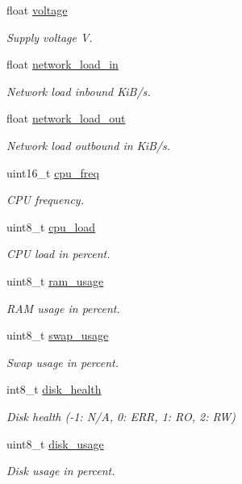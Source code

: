 \begin{DoxyCompactItemize}
float \hyperlink{struct____mavlink__onboard__health__t_a63f5df641cd3ed8be2383ef20a722839}{voltage}
\begin{DoxyCompactList}\small\item\em Supply voltage V. \end{DoxyCompactList}\item 
float \hyperlink{struct____mavlink__onboard__health__t_a011cccc424ed465b57dddd3bba36a4b5}{network\+\_\+load\+\_\+in}
\begin{DoxyCompactList}\small\item\em Network load inbound Ki\+B/s. \end{DoxyCompactList}\item 
float \hyperlink{struct____mavlink__onboard__health__t_a472007050b0e6533c2933fad245f6c75}{network\+\_\+load\+\_\+out}
\begin{DoxyCompactList}\small\item\em Network load outbound in Ki\+B/s. \end{DoxyCompactList}\item 
uint16\+\_\+t \hyperlink{struct____mavlink__onboard__health__t_a2d8c4b91795a9c519f1fcd0f31991138}{cpu\+\_\+freq}
\begin{DoxyCompactList}\small\item\em C\+P\+U frequency. \end{DoxyCompactList}\item 
uint8\+\_\+t \hyperlink{struct____mavlink__onboard__health__t_a3d36195b20398d29d74c79cafd00f16a}{cpu\+\_\+load}
\begin{DoxyCompactList}\small\item\em C\+P\+U load in percent. \end{DoxyCompactList}\item 
uint8\+\_\+t \hyperlink{struct____mavlink__onboard__health__t_af183f121fb9c0bf2cdfda9298e291f2d}{ram\+\_\+usage}
\begin{DoxyCompactList}\small\item\em R\+A\+M usage in percent. \end{DoxyCompactList}\item 
uint8\+\_\+t \hyperlink{struct____mavlink__onboard__health__t_abc5e2e0aac9dd67244bafec63725e55e}{swap\+\_\+usage}
\begin{DoxyCompactList}\small\item\em Swap usage in percent. \end{DoxyCompactList}\item 
int8\+\_\+t \hyperlink{struct____mavlink__onboard__health__t_a080927aed4b1fe7205a1c5bc611d7bbd}{disk\+\_\+health}
\begin{DoxyCompactList}\small\item\em Disk health (-\/1\+: N/\+A, 0\+: E\+R\+R, 1\+: R\+O, 2\+: R\+W) \end{DoxyCompactList}\item 
uint8\+\_\+t \hyperlink{struct____mavlink__onboard__health__t_aaec3043a7ce4f8e456c89d85b3a9d53f}{disk\+\_\+usage}
\begin{DoxyCompactList}\small\item\em Disk usage in percent. \end{DoxyCompactList}\end{DoxyCompactItemize}


